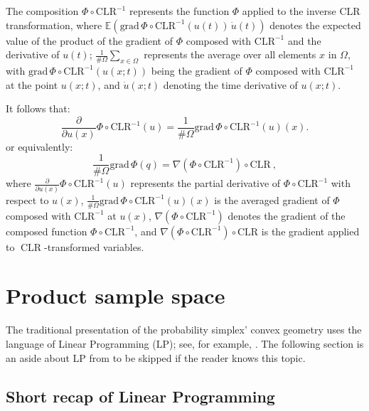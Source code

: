 \documentclass[axioms,article,submit,pdftex,moreauthors]{Definitions/mdpi}
\theoremstyle{plain}
\theoremstyle{remark}
\newcommand{\CLR}{\operatorname{CLR}}
\begin{document}
The composition \(\Phi \circ \text{CLR}^{-1}\) represents the function \(\Phi\) applied to the inverse CLR transformation, where \(\mathbb{E} \left( \text{grad} \, \Phi \circ \text{CLR}^{-1}(u(t)) \, \dot{u}(t) \right)\) denotes the expected value of the product of the gradient of \(\Phi\) composed with \(\text{CLR}^{-1}\) and the derivative of \(u(t)\); \(\frac{1}{\#\Omega} \sum_{x \in \Omega}\) represents the average over all elements \(x\) in \(\Omega\), with \(\text{grad} \, \Phi \circ \text{CLR}^{-1}(u(x; t))\) being the gradient of \(\Phi\) composed with \(\text{CLR}^{-1}\) at the point \(u(x; t)\), and \(\dot{u}(x; t)\) denoting the time derivative of \(u(x; t)\).

It follows that:
\begin{equation*} 
\frac{\partial}{\partial u(x)} \Phi \circ \text{CLR}^{-1}(u) = \frac{1}{\#\Omega} \text{grad} \, \Phi \circ \text{CLR}^{-1}(u)(x).
\end{equation*} 
or equivalently:
\begin{equation*} 
\frac{1}{\#\Omega} \text{grad} \, \Phi(q) = \nabla (\Phi \circ \text{CLR}^{-1}) \circ \text{CLR} \ ,
\end{equation*} 
where \(\frac{\partial}{\partial u(x)} \Phi \circ \text{CLR}^{-1}(u)\) represents the partial derivative of \(\Phi \circ \text{CLR}^{-1}\) with respect to \(u(x)\), \(\frac{1}{\#\Omega} \text{grad} \, \Phi \circ \text{CLR}^{-1}(u)(x)\) is the averaged gradient of \(\Phi\) composed with \(\text{CLR}^{-1}\) at \(u(x)\), \(\nabla (\Phi \circ \text{CLR}^{-1})\) denotes the gradient of the composed function \(\Phi \circ \text{CLR}^{-1}\), and \(\nabla (\Phi \circ \text{CLR}^{-1}) \circ \text{CLR}\) is the gradient applied to $\CLR$-transformed variables.

\section{Product sample space}
\label{sec:product-sample-space}

The traditional presentation of the probability simplex' convex geometry uses the language of Linear Programming (LP); see, for example, \cite[Ch.~IV]{barvinok:2002}. The following section is an aside about LP from \cite[\S~IV.10]{barvinok:2002} to be skipped if the reader knows this topic.

\subsection{Short recap of Linear Programming}
\end{document}
